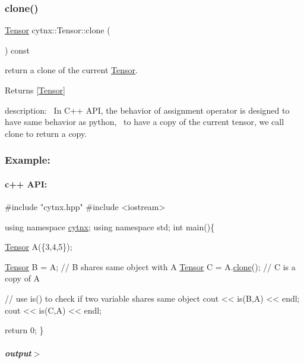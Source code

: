 \subsubsection{\texorpdfstring{clone()}{clone()}}
{\footnotesize\ttfamily \hyperlink{classcytnx_1_1Tensor}{Tensor} cytnx\+::\+Tensor\+::clone (\begin{DoxyParamCaption}{ }\end{DoxyParamCaption}) const\hspace{0.3cm}{\ttfamily [inline]}}



return a clone of the current \hyperlink{classcytnx_1_1Tensor}{Tensor}. 

\begin{DoxyReturn}{Returns}
\mbox{[}\hyperlink{classcytnx_1_1Tensor}{Tensor}\mbox{]}
\end{DoxyReturn}
description\+:~\newline
 In C++ A\+PI, the behavior of assignment operator is designed to have same behavior as python,~\newline
 to have a copy of the current tensor, we call clone to return a copy.

\subsubsection*{Example\+:}

\paragraph*{c++ A\+PI\+:}


\begin{DoxyCodeInclude}
\textcolor{preprocessor}{#include "cytnx.hpp"}
\textcolor{preprocessor}{#include <iostream>}


\textcolor{keyword}{using namespace }\hyperlink{namespacecytnx}{cytnx};
\textcolor{keyword}{using namespace }std;
\textcolor{keywordtype}{int} main()\{ 

    \hyperlink{classcytnx_1_1Tensor}{Tensor} A(\{3,4,5\});

    \hyperlink{classcytnx_1_1Tensor}{Tensor} B = A; \textcolor{comment}{// B shares same object with A}
    \hyperlink{classcytnx_1_1Tensor}{Tensor} C = A.\hyperlink{classcytnx_1_1Tensor_a5e2248e9babdb786167ed349df9084ae}{clone}(); \textcolor{comment}{// C is a copy of A}
    
    \textcolor{comment}{// use is() to check if two variable shares same object}
    cout << is(B,A) << endl;
    cout << is(C,A) << endl;

    \textcolor{keywordflow}{return} 0;
\}

\end{DoxyCodeInclude}
 \subparagraph*{output$>$}


